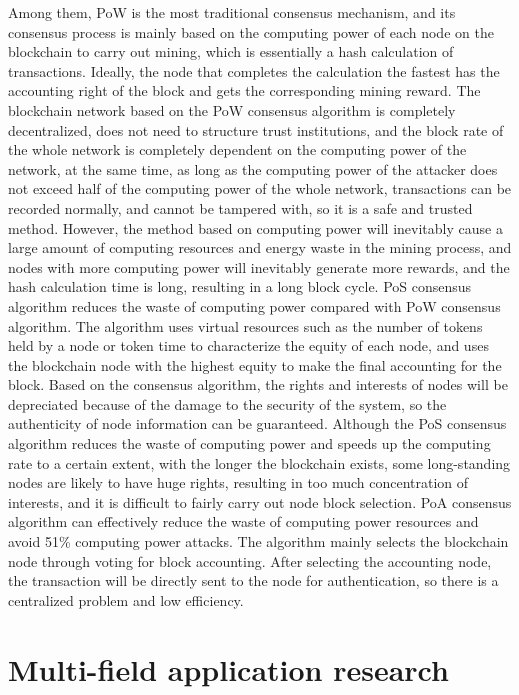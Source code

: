 \documentclass[lettersize,journal]{IEEEtran}
\begin{document}
Among them, PoW is the most traditional consensus mechanism, and its consensus process is mainly based on the computing power of each node on the blockchain to carry out mining, which is essentially a hash calculation of transactions. Ideally, the node that completes the calculation the fastest has the accounting right of the block and gets the corresponding mining reward. The blockchain network based on the PoW consensus algorithm is completely decentralized, does not need to structure trust institutions, and the block rate of the whole network is completely dependent on the computing power of the network, at the same time, as long as the computing power of the attacker does not exceed half of the computing power of the whole network, transactions can be recorded normally, and cannot be tampered with, so it is a safe and trusted method. However, the method based on computing power will inevitably cause a large amount of computing resources and energy waste in the mining process, and nodes with more computing power will inevitably generate more rewards, and the hash calculation time is long, resulting in a long block cycle. PoS consensus algorithm reduces the waste of computing power compared with PoW consensus algorithm. The algorithm uses virtual resources such as the number of tokens held by a node or token time to characterize the equity of each node, and uses the blockchain node with the highest equity to make the final accounting for the block. Based on the consensus algorithm, the rights and interests of nodes will be depreciated because of the damage to the security of the system, so the authenticity of node information can be guaranteed. 
Although the PoS consensus algorithm reduces the waste of computing power and speeds up the computing rate to a certain extent, with the longer the blockchain exists, some long-standing nodes are likely to have huge rights, resulting in too much concentration of interests, and it is difficult to fairly carry out node block selection. PoA consensus algorithm can effectively reduce the waste of computing power resources and avoid 51\% computing power attacks. The algorithm mainly selects the blockchain node through voting for block accounting. After selecting the accounting node, the transaction will be directly sent to the node for authentication, so there is a centralized problem and low efficiency.

\section{Multi-field application research }
\end{document}
